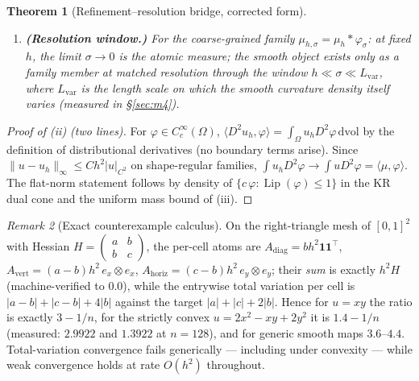 \documentclass[11pt,a4paper]{article}
\theoremstyle{plain}
\newtheorem{theorem}{Theorem}[section]
\theoremstyle{definition}
\theoremstyle{remark}
\newtheorem{remark}[theorem]{Remark}
\newcommand{\Lip}{\operatorname{Lip}}
\newcommand{\dvol}{\,\mathrm{dvol}}
\begin{document}
\begin{theorem}[Refinement--resolution bridge, corrected form]
\begin{enumerate}[label=(\roman*),leftmargin=2em]
      naive three-facet patch is not the dual cell; the general statement
      requires the discrete-duality (dual-diamond) pairing.
\item \textbf{(Resolution window.)} For the coarse-grained family
      $\mu_{h,\sigma} = \mu_h * \varphi_\sigma$: at fixed $h$, the limit
      $\sigma \to 0$ is the \emph{atomic} measure; the smooth object
      exists only as a family member at matched resolution through the
      window $h \ll \sigma \ll L_{\mathrm{var}}$, where $L_{\mathrm{var}}$
      is the length scale on which the smooth curvature density itself
      varies (measured in \S\ref{sec:m4}).
\end{enumerate}
\end{theorem}

\begin{proof}[Proof of (ii) (two lines)]
For $\varphi \in C_c^\infty(\Omega)$,
$\langle D^2 u_h, \varphi\rangle = \int_\Omega u_h D^2\varphi \dvol$ by the
definition of distributional derivatives (no boundary terms arise).
Since $\|u - u_h\|_\infty \le C h^2 |u|_{C^2}$ on shape-regular families,
$\int u_h D^2\varphi \to \int u D^2\varphi = \langle \mu, \varphi\rangle$.
The flat-norm statement follows by density of
$\{c\,\varphi : \Lip(\varphi)\le 1\}$ in the KR dual cone and the uniform
mass bound of (iii).
\end{proof}

\begin{remark}[Exact counterexample calculus]\label{rem:tvcounter}
On the right-triangle mesh of $[0,1]^2$ with Hessian
$H = \left(\begin{smallmatrix} a & b\\ b & c\end{smallmatrix}\right)$, the
per-cell atoms are $A_{\mathrm{diag}} = b h^2 \mathbf{1}\mathbf{1}^\top$,
$A_{\mathrm{vert}} = (a-b) h^2\, e_x \otimes e_x$,
$A_{\mathrm{horiz}} = (c-b) h^2\, e_y \otimes e_y$; their \emph{sum} is
exactly $h^2 H$ (machine-verified to $0.0$), while the entrywise total
variation per cell is $|a-b| + |c-b| + 4|b|$ against the target
$|a| + |c| + 2|b|$. Hence for $u = xy$ the ratio is exactly $3 - 1/n$, for
the strictly convex $u = 2x^2 - xy + 2y^2$ it is $1.4 - 1/n$ (measured:
$2.9922$ and $1.3922$ at $n=128$), and for generic smooth maps $3.6$--$4.4$.
Total-variation convergence fails generically --- including under
convexity --- while weak convergence holds at rate $O(h^2)$ throughout.
\end{remark}
\end{document}
